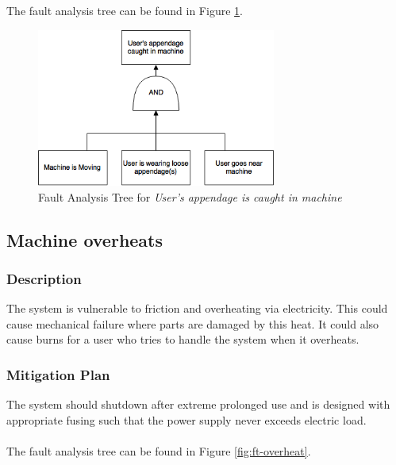 \documentclass[11pt]{article}
\begin{document}
The fault analysis tree can be found in Figure \ref{fig:ft-appendage}.

\begin{figure}[H]
   \centering
   \includegraphics[width=0.7\textwidth]{img/ft-appendage.png} %
   \caption{Fault Analysis Tree for \textit{User's appendage is caught in machine}}
   \label{fig:ft-appendage}
\end{figure}

\subsection{Machine overheats}
\subsubsection*{Description}
The system is vulnerable to friction and overheating via electricity. This could cause mechanical failure where parts are damaged by this heat. It could also cause burns for a user who tries to handle the system when it overheats.
\subsubsection*{Mitigation Plan}
The system should shutdown after extreme prolonged use and is designed with appropriate fusing such that the power supply never exceeds electric load. \\ \\

The fault analysis tree can be found in Figure \ref{fig:ft-overheat}.
\end{document}
